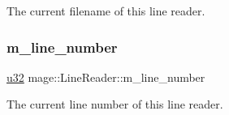The current filename of this line reader. \hypertarget{classmage_1_1_line_reader_ad38c64a46fef8e7bf8d7429b99a73746}{}\label{classmage_1_1_line_reader_ad38c64a46fef8e7bf8d7429b99a73746} 
\subsubsection{\texorpdfstring{m\+\_\+line\+\_\+number}{m\_line\_number}}
{\footnotesize\ttfamily \hyperlink{namespacemage_af2b398bf98eb10351f49cad73fe2cc73}{u32} mage\+::\+Line\+Reader\+::m\+\_\+line\+\_\+number\hspace{0.3cm}{\ttfamily [private]}}

The current line number of this line reader. 